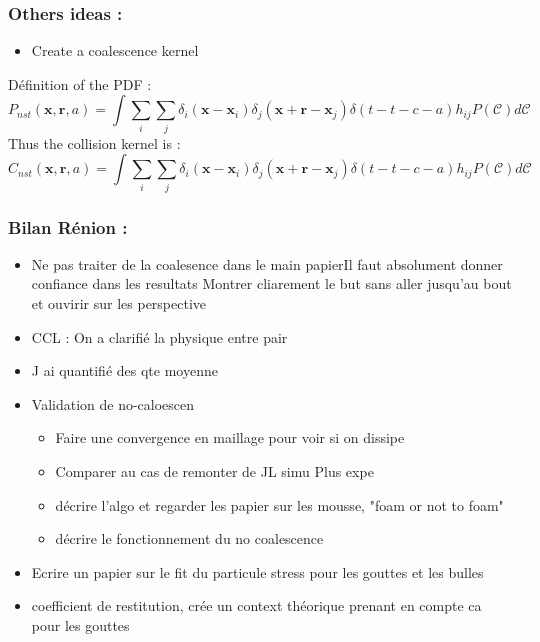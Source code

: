 \documentclass{sintefbeamer}
\begin{document}
\begin{frame}
  \frametitle{Others ideas :}
  \begin{itemize}
    \item Create a coalescence kernel 
\end{itemize}
Définition of the PDF : 
  \begin{equation}
    P_{nst}(\textbf{x},\textbf{r},a)
    = \int \sum_i \sum_j 
    \delta_i(\textbf{x}-\textbf{x}_i)
    \delta_j(\textbf{x} + \textbf{r}-\textbf{x}_j)
    \delta(t - t-c -a)
    h_{ij}
    P(\mathscr{C})d\mathscr{C}
  \end{equation}
  Thus the collision kernel is : 
  \begin{equation}
    C_{nst}(\textbf{x},\textbf{r},a)
    = \int \sum_i \sum_j 
    \delta_i(\textbf{x}-\textbf{x}_i)
    \delta_j(\textbf{x} + \textbf{r}-\textbf{x}_j)
    \delta(t - t-c -a)
    h_{ij}
    P(\mathscr{C})d\mathscr{C}
  \end{equation}

\end{frame}

\begin{frame}
  \frametitle{Bilan Rénion :}
  \begin{itemize}
    \item Ne pas traiter de la coalesence dans le main papierIl faut absolument donner confiance dans les resultats 
    Montrer cliarement le but sans aller jusqu'au bout et ouvirir sur les perspective
    \item CCL : On a clarifié la physique entre pair 
    \item J ai quantifié des qte moyenne
    \item Validation de no-caloescen
    \begin{itemize}
      \item Faire une convergence en maillage pour voir si on dissipe 
      \item Comparer au cas de remonter de JL simu Plus expe
      \item décrire l'algo et regarder les papier sur les mousse, "foam or not to foam"
      \item décrire le fonctionnement du no coalescence
    \end{itemize}
    \item Ecrire un papier sur le fit du particule stress pour les gouttes et les bulles 
    \item coefficient de restitution, crée un context théorique prenant en compte ca pour les gouttes 
\end{itemize}
\end{frame}
\end{document}
